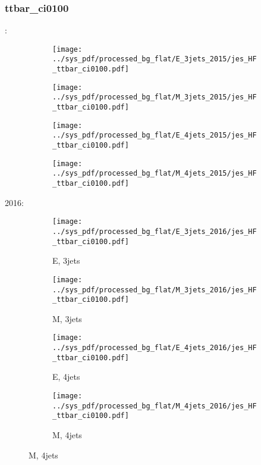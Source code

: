 \documentclass{beamer}
\begin{document}
\begin{frame}
\frametitle{ttbar_ci0100}
\fontsize{5}{1}:
\begin{figure}
\centering
\begin{subfigure}[b]{0.24\textwidth}
\texttt{[image: ../sys\_pdf/processed\_bg\_flat/E\_3jets\_2015/jes\_HF\_ttbar\_ci0100.pdf]}
\end{subfigure}
\begin{subfigure}[b]{0.24\textwidth}
\texttt{[image: ../sys\_pdf/processed\_bg\_flat/M\_3jets\_2015/jes\_HF\_ttbar\_ci0100.pdf]}
\end{subfigure}
\begin{subfigure}[b]{0.24\textwidth}
\texttt{[image: ../sys\_pdf/processed\_bg\_flat/E\_4jets\_2015/jes\_HF\_ttbar\_ci0100.pdf]}
\end{subfigure}
\begin{subfigure}[b]{0.24\textwidth}
\texttt{[image: ../sys\_pdf/processed\_bg\_flat/M\_4jets\_2015/jes\_HF\_ttbar\_ci0100.pdf]}
\end{subfigure}
\end{figure}
2016:
\begin{figure}
\centering
\begin{subfigure}[b]{0.24\textwidth}
\texttt{[image: ../sys\_pdf/processed\_bg\_flat/E\_3jets\_2016/jes\_HF\_ttbar\_ci0100.pdf]}
\captionsetup{font=tiny}
\caption{E, 3jets}
\end{subfigure}
\begin{subfigure}[b]{0.24\textwidth}
\texttt{[image: ../sys\_pdf/processed\_bg\_flat/M\_3jets\_2016/jes\_HF\_ttbar\_ci0100.pdf]}
\captionsetup{font=tiny}
\caption{M, 3jets}
\end{subfigure}
\begin{subfigure}[b]{0.24\textwidth}
\texttt{[image: ../sys\_pdf/processed\_bg\_flat/E\_4jets\_2016/jes\_HF\_ttbar\_ci0100.pdf]}
\captionsetup{font=tiny}
\caption{E, 4jets}
\end{subfigure}
\begin{subfigure}[b]{0.24\textwidth}
\texttt{[image: ../sys\_pdf/processed\_bg\_flat/M\_4jets\_2016/jes\_HF\_ttbar\_ci0100.pdf]}
\captionsetup{font=tiny}
\caption{M, 4jets}
\end{subfigure}
\end{figure}
\end{frame}
\end{document}
